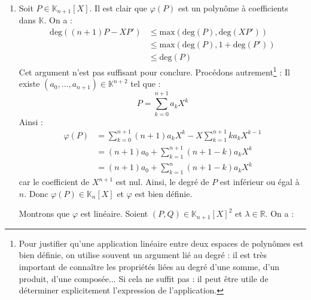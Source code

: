 \documentclass[a4paper,twoside,french,11pt]{VcCours}
\begin{document}
\begin{Exercice}{}\end{Exercice}

\begin{enumerate}
\item Soit $P \in \mathbb{K}_{n+1}[X]$. Il est clair que $\varphi(P)$ est un polynôme à coefficients dans $\mathbb{K}$. On a :
\begin{align*}
\textrm{deg}((n+1)P -XP') & \leq  \textrm{max}(\textrm{deg}(P), \textrm{deg}(XP')) \\
& \leq  \textrm{max}(\textrm{deg}(P), 1 +\textrm{deg}(P') ) \\
 &\leq  \textrm{deg}(P) 
\end{align*}
Cet argument n'est pas suffisant pour conclure. Procédons autrement\footnote{Pour justifier qu'une application linéaire entre deux espaces de polynômes est bien définie, on utilise souvent un argument lié au degré : il est très important de connaître les propriétés liées au degré d'une somme, d'un produit, d'une composée... Si cela ne suffit pas : il peut être utile de déterminer explicitement l'expression de l'application.} : Il existe $(a_0, \ldots, a_{n+1}) \in \mathbb{K}^{n+2}$ tel que :
$$ P = \sum_{k=0}^{n+1} a_k X^k $$
Ainsi :
\begin{align*}
\varphi(P) & = \sum_{k=0}^{n+1} (n+1) a_k X^k - X \sum_{k=1}^{n+1} k a_k X^{k-1}  \\
& = (n+1)a_0  + \sum_{k=1}^{n+1} (n+1-k)a_k X^k  \\
& = (n+1)a_0 + \sum_{k=1}^{n} (n+1-k)a_k X^k  
\end{align*} 
car le coefficient de $X^{n+1}$ est nul. Ainsi, le degré de $P$ est inférieur ou égal à $n$. Donc $\varphi(P) \in \mathbb{K}_n[X]$ et $\varphi$ est bien définie.



\noindent Montrons que $\varphi$ est linéaire. Soient $(P,Q) \in \mathbb{K}_{n+1}[X]^2$ et $\lambda \in \mathbb{R}$. On a :


\end{enumerate}
\end{document}
